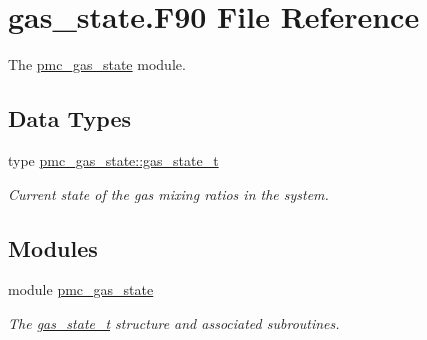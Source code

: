 \hypertarget{gas__state_8_f90}{}\section{gas\+\_\+state.\+F90 File Reference}
\label{gas__state_8_f90}


The \mbox{\hyperlink{namespacepmc__gas__state}{pmc\+\_\+gas\+\_\+state}} module.  


\subsection*{Data Types}
\begin{DoxyCompactItemize}
\item 
type \mbox{\hyperlink{structpmc__gas__state_1_1gas__state__t}{pmc\+\_\+gas\+\_\+state\+::gas\+\_\+state\+\_\+t}}
\begin{DoxyCompactList}\small\item\em Current state of the gas mixing ratios in the system. \end{DoxyCompactList}\end{DoxyCompactItemize}
\subsection*{Modules}
\begin{DoxyCompactItemize}
\item 
module \mbox{\hyperlink{namespacepmc__gas__state}{pmc\+\_\+gas\+\_\+state}}
\begin{DoxyCompactList}\small\item\em The \mbox{\hyperlink{structpmc__gas__state_1_1gas__state__t}{gas\+\_\+state\+\_\+t}} structure and associated subroutines. \end{DoxyCompactList}\end{DoxyCompactItemize}

